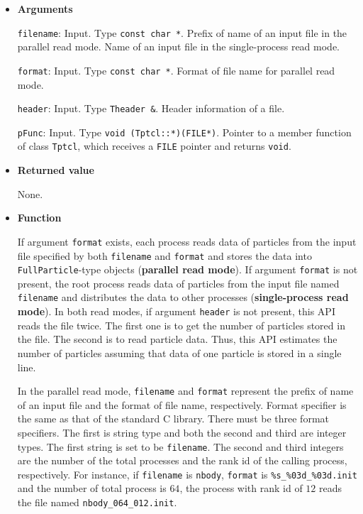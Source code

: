 \begin{itemize}

\item {\bf Arguments}

\texttt{filename}: Input. Type \texttt{const char *}. Prefix of name of an input file in the parallel read mode. Name of an input file in the single-process read mode.

\texttt{format}: Input. Type \texttt{const char *}. Format of file name for parallel read mode.

\texttt{header}: Input. Type \texttt{Theader \&}. Header information of a file.

\texttt{pFunc}: Input. Type \texttt{void (Tptcl::*)(FILE*)}. Pointer to a member function of class \texttt{Tptcl}, which receives a \texttt{FILE} pointer and returns \texttt{void}.


\item {\bf Returned value}

None.

\item {\bf Function}

If argument \texttt{format} exists, each process reads data of particles from the input file specified by both \texttt{filename} and \texttt{format} and stores the data into \texttt{FullParticle}-type objects (\textbf{parallel read mode}). If argument \texttt{format} is not present, the root process reads data of particles from the input file named \texttt{filename} and distributes the data to other processes (\textbf{single-process read mode}). In both read modes, if argument \texttt{header} is not present, this API reads the file twice. The first one is to get the number of particles stored in the file. The second is to read particle data. Thus, this API estimates the number of particles assuming that data of one particle is stored in a single line.


In the parallel read mode, \texttt{filename} and \texttt{format} represent the prefix of name of an input file and the format of file name, respectively. Format specifier is the same as that of the standard C library. There must be three format specifiers. The first is string type and both the second and third are integer types. The first string is set to be \texttt{filename}. The second and third integers are the number of the total processes and the rank id of the calling process, respectively. For instance, if \texttt{filename} is \texttt{nbody}, \texttt{format} is \texttt{\%s\_\%03d\_\%03d.init} and the number of total process is $64$, the process with rank id of $12$ reads the file named \texttt{nbody\_064\_012.init}.


\end{itemize}
